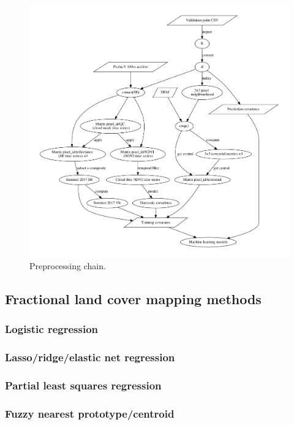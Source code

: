 \documentclass[a4paper,10pt]{article}
\begin{document}
\begin{figure}
 \includegraphics[width=\textwidth]{article-figures/algorithms}
 \caption{Preprocessing chain.}
 \label{fig-preprocessing}
\end{figure}


\subsection{Fractional land cover mapping methods}

\subsubsection{Logistic regression}

\subsubsection{Lasso/ridge/elastic net regression}

\subsubsection{Partial least squares regression}

\subsubsection{Fuzzy nearest prototype/centroid}
\end{document}
